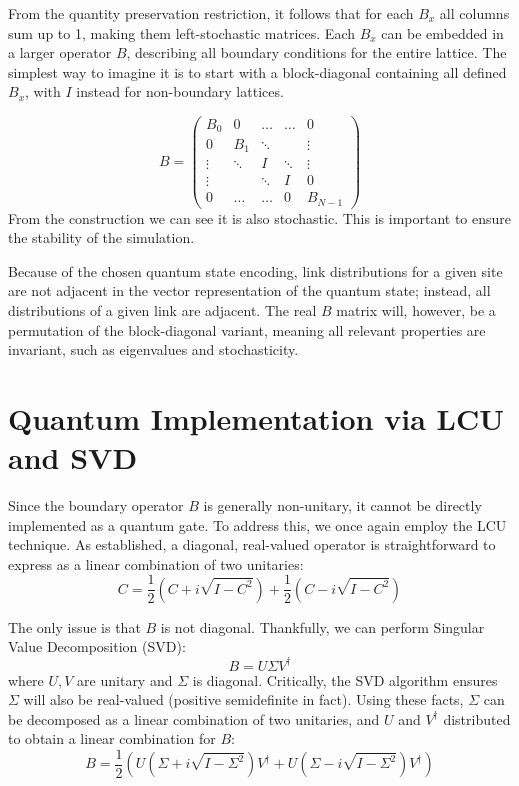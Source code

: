 From the quantity preservation restriction, it follows that for each $B_x$ all columns sum up to 1, making them left-stochastic matrices.
Each $B_x$ can be embedded in a larger operator $B$, describing all boundary conditions for the entire lattice.
The simplest way to imagine it is to start with a block-diagonal containing all defined $B_x$, with $I$ instead for non-boundary lattices.

\begin{equation*}
B = \begin{pmatrix}
    B_0    & 0      & \dots  & \dots  & 0 \\
    0      & B_1    & \ddots &        & \vdots \\
    \vdots & \ddots & I    & \ddots & \vdots \\
    \vdots &        & \ddots & I      & 0 \\
    0      & \dots  & \dots  & 0      & B_{N-1}
\end{pmatrix}
\end{equation*}
From the construction we can see it is also stochastic. This is important to ensure the stability of the simulation.


Because of the chosen quantum state encoding, link distributions for a given site are not adjacent in the vector representation of the quantum state; instead, all distributions of a given link are adjacent.
The real $B$ matrix will, however, be a permutation of the block-diagonal variant, meaning all relevant properties are invariant, such as eigenvalues and stochasticity.

\section{Quantum Implementation via LCU and SVD}
\label{sec:bc-implementation}

Since the boundary operator $B$ is generally non-unitary, it cannot be directly implemented as a quantum gate.
To address this, we once again employ the LCU technique.
As established, a diagonal, real-valued operator is straightforward to express as a linear combination of two unitaries:
\begin{equation*}
C = \frac{1}{2} (C + i\sqrt{I - C^2}) + \frac{1}{2}(C - i\sqrt{I - C^2})
\end{equation*}

The only issue is that $B$ is not diagonal.
Thankfully, we can perform Singular Value Decomposition (SVD):
\begin{equation*}
    B = U \Sigma V^{\dagger}
\end{equation*}
where $U, V$ are unitary and $\Sigma$ is diagonal.
Critically, the SVD algorithm ensures $\Sigma$ will also be real-valued (positive semidefinite in fact).
Using these facts, $\Sigma$ can be decomposed as a linear combination of two unitaries, and $U$ and $V^{\dagger}$ distributed to obtain a linear combination for $B$:
\begin{equation*}
    B = \frac{1}{2} (U (\Sigma + i\sqrt{I - \Sigma^2}) V^{\dagger} + U (\Sigma - i\sqrt{I - \Sigma^2}) V^{\dagger})
\end{equation*}

